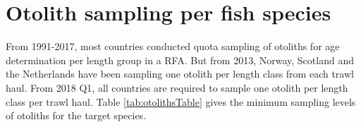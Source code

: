 \documentclass[a4paper 12pt]{article}
\numberwithin{equation}{section}
\begin{document}
\section{\large Otolith sampling per fish species}
\label{secAp:otolithappendix}
From 1991-2017, most countries conducted quota sampling of otoliths for age determination per length group in a RFA. But from 2013, Norway, Scotland and the Netherlands have been sampling one otolith per length class from each trawl haul. From 2018 Q1, all countries are required to sample one otolith per length class per trawl haul.  Table \ref{tab:otolithsTable} gives the minimum sampling levels of otoliths for the target species.\\ %
\end{document}
